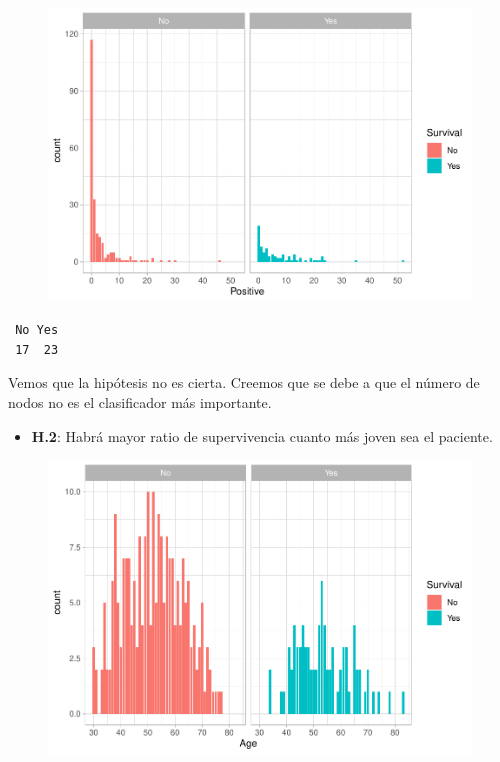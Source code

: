 \begin{figure}[H]\includegraphics[width=.9\linewidth]{img/EDA2_files/figure-latex/unnamed-chunk-31-1} \end{figure}

\begin{verbatim}
 No Yes 
 17  23 
\end{verbatim}

Vemos que la hipótesis no es cierta. Creemos que se debe a que el número de nodos no es el clasificador más importante.

\begin{itemize}
    \item \textbf{H.2}: Habrá mayor ratio de supervivencia cuanto más joven sea el paciente.
\end{itemize}

\begin{figure}[H]\includegraphics[width=.9\linewidth]{img/EDA2_files/figure-latex/unnamed-chunk-33-1} \end{figure}

